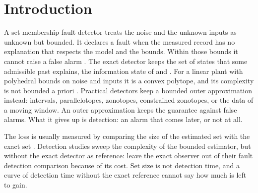 \documentclass[11pt,a4paper]{article}
\begin{document}
\begin{abstract}
single LP the solver could not solve became an uncertified alarm; we report that failure, the sound fallback that
replaced it, and its tests under injected solver failures. We also show that no memory budget can certify the error of
a sensor drift that an admissible ambient path reproduces. On the second block, two comparisons fixed before they ran,
with seven baselines given the same assumptions and tuned on development data, found every baseline behind our
monitor at its memory budget. The nearest set-based one, an interval observer given the measurement, the
reachable-set bounds and the interval monitor's rate rule, removed 8.8\,\% of the interval monitor's lag where the
template removed 44.2\,\% on that block; the window with a filtering base update had three times the window's lag.
\end{abstract}

\section{Introduction}

A set-membership fault detector treats the noise and the unknown inputs as unknown but bounded. It declares a fault
when the measured record has no explanation that respects the model and the bounds. Within those bounds it cannot
raise a false alarm \citep{ingimundarson2005,scott2016,puig2010}. The exact detector keeps the set of states that some
admissible past explains, the information state of \citet{witsenhausen1968} and \citet{schweppe1968}. For a linear plant
with polyhedral bounds on noise and inputs it is a convex polytope, and its complexity is not bounded a priori
\citep{sznaier2011,blanchini2012}. Practical detectors keep a bounded outer approximation instead: intervals,
parallelotopes, zonotopes, constrained zonotopes, or the data of a moving window. An outer approximation keeps the
guarantee against false alarms. What it gives up is detection: an alarm that comes later, or not at all.

The loss is usually measured by comparing the size of the estimated set with the exact set
\citetext{\citealp[Sec.~5]{scott2016}; \citealp[Sec.~6]{casini2024}}. Detection studies sweep the complexity of the bounded estimator,
but without the exact detector as reference: \citet[p.~133]{scott2016} leave the exact observer out of their fault
detection comparison because of its cost. Set size is not detection time, and a curve of detection time without the
exact reference cannot say how much is left to gain.
\end{document}
